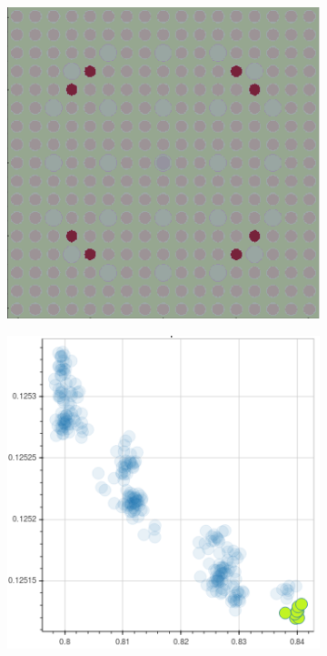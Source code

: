 \begin{figure}[h!]
\begin{subfigure}{0.42\textwidth}
  \caption{}
  \label{fig:chap10-capt-mean-spect-ind-mgxs}
\end{subfigure}
\begin{subfigure}{0.42\textwidth}
  \centering
  \includegraphics[width=0.9\linewidth]{figures/unsupervised/features/assm-16/u238-capt/mean-spect-ind/geometry-2}
  \caption{}
  \label{fig:chap10-capt-mean-spect-ind-geom-2}
\end{subfigure}%
\begin{subfigure}{0.42\textwidth}
  \centering
  \includegraphics[width=0.9\linewidth]{figures/unsupervised/features/assm-16/u238-capt/mean-spect-ind/mgxs-2}

\end{subfigure}
\end{figure}
